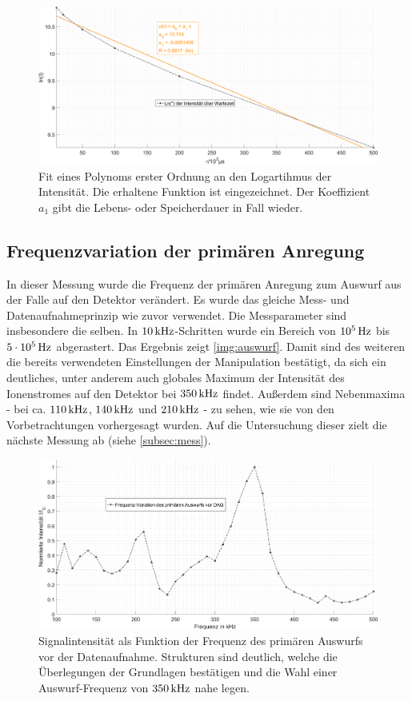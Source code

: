 \documentclass[numbers=noenddot,a4paper,notitlepage,twoside,BCOR15mm]{scrartcl}
\newcommand{\tenpo}[1]{ 10^{#1}}
\begin{document}
		\begin{figure}
			\includegraphics[width=\textwidth]{pics/linear_fit_wartezeit.png}
			\caption{Fit eines Polynoms erster Ordnung an den Logartihmus der Intensität. Die erhaltene Funktion ist eingezeichnet. Der Koeffizient $a_1$ gibt die Lebens- oder Speicherdauer in Fall wieder.}\label{img:lin}
		\end{figure}
		
		\subsection{Frequenzvariation der primären Anregung}
		
		In dieser Messung wurde die Frequenz der primären Anregung zum Auswurf aus der Falle auf den Detektor verändert. Es wurde das gleiche Mess- und Datenaufnahmeprinzip wie zuvor verwendet. Die Messparameter sind insbesondere die selben. In $\unit[10]{kHz}$-Schritten wurde ein Bereich von $\unit[\tenpo{5}]{Hz}$ bis $\unit[5\cdot\tenpo{5}]{Hz}$ abgerastert. Das Ergebnis zeigt \autoref{img:auswurf}. Damit sind des weiteren die bereits verwendeten Einstellungen der Manipulation bestätigt, da sich ein deutliches, unter anderem auch globales Maximum der Intensität des Ionenstromes auf den Detektor bei $\unit[350]{kHz}$ findet. Außerdem sind Nebenmaxima - bei ca. $\unit[110]{kHz}$, $\unit[140]{kHz}$ und $\unit[210]{kHz}$ - zu sehen, wie sie von den Vorbetrachtungen vorhergesagt wurden. Auf die Untersuchung dieser zielt die nächste Messung ab (siehe \autoref{subsec:mess}).
		
		\begin{figure}
			\includegraphics[width=\textwidth]{pics/freq_auswurf.png}
			\caption{Signalintensität als Funktion der Frequenz des primären Auswurfs vor der Datenaufnahme. Strukturen sind deutlich, welche die Überlegungen der Grundlagen bestätigen und die Wahl einer Auswurf-Frequenz von $\unit[350]{kHz}$ nahe legen.}\label{img:auswurf}
		\end{figure}
		
\end{document}
